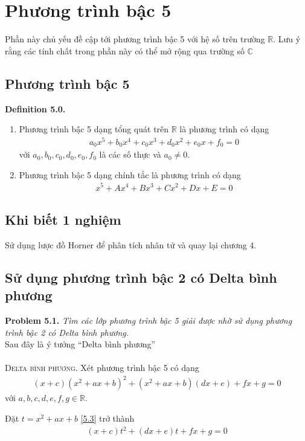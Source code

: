 \documentclass[a4paper,oneside]{book}
\numberwithin{equation}{chapter}
\begin{document}
\chapter{Phương trình bậc 5}
Phần này chủ yếu đề cập tới phương trình bậc 5 với hệ số trên trường $\mathbb{R}$. Lưu ý rằng các tính chất trong phần này có thể mở rộng qua trường số $\mathbb{C}$
\section{Phương trình bậc 5}
\textbf{Definition 5.0.} 
\begin{enumerate}
\item Phương trình bậc 5 dạng tổng quát trên $\mathbb{R}$ là phương trình có dạng
\begin{align}
{a_0}{x^5} + {b_0}{x^4} + {c_0}{x^3} + {d_0}x^2 + {e_0}x+f_0= 0
\end{align}
với $a_0,b_0,c_0,d_0,e_0,f_0$ là các số thực và $a_0 \ne 0$.
\item Phương trình bậc 5 dạng chính tắc là phương trình có dạng
\begin{align}
{x^5} + A{x^4} + B{x^3} + C{x^2} + Dx + E = 0
\end{align}
\end{enumerate}

\section{Khi biết 1 nghiệm}
Sử dụng lược đồ Horner để phân tích nhân tử và quay lại chương 4.
\section{Sử dụng phương trình bậc 2 có Delta bình phương}
\textbf{Problem 5.1.} \textit{Tìm các lớp phương trình bậc 5 giải được nhờ sử dụng phương trình bậc 2 có Delta bình phương.}\\

Sau đây là ý tưởng ``Delta bình phương''\\
\\
\textsc{Delta bình phương.} Xét phương trình bậc 5 có dạng
\begin{align}
\label{5.3}
\left( {x + c} \right){\left( {{x^2} + ax + b} \right)^2} + \left( {{x^2} + ax + b} \right)\left( {dx + e} \right) + fx + g = 0
\end{align}
với $a,b,c,d,e,f,g \in \mathbb{R}$.

Đặt $t = {x^2} + ax + b$ \eqref{5.3} trở thành
\begin{align}
\label{5.4}
\left( {x + c} \right){t^2} + \left( {dx + e} \right)t + fx + g = 0
\end{align}
\end{document}
